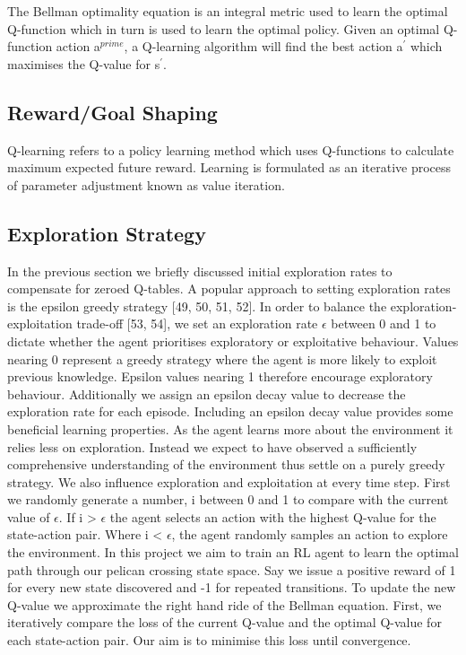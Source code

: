 \documentclass[runningheads]{llncs}
\begin{document}
The Bellman optimality equation is an integral metric used to learn the optimal Q-function
which in turn is used to learn the optimal policy. Given an optimal Q-function action a$^{prime}$, a
Q-learning algorithm will find the best action a$^{\prime}$ which maximises the Q-value for s$^{\prime}$.


\subsection{Reward/Goal Shaping}
Q-learning refers to a policy learning method which uses Q-functions to calculate maximum
expected future reward. Learning is formulated as an iterative process of parameter
adjustment known as value iteration.

\subsection{Exploration Strategy}
In the previous section we briefly discussed initial exploration rates to compensate for
zeroed Q-tables. A popular approach to setting exploration rates is the epsilon greedy
strategy [49, 50, 51, 52]. In order to balance the exploration-exploitation trade-off [53, 54],
we set an exploration rate $\epsilon$ between 0 and 1 to dictate whether the agent prioritises
exploratory or exploitative behaviour. Values nearing 0 represent a greedy strategy where
the agent is more likely to exploit previous knowledge. Epsilon values nearing 1 therefore
encourage exploratory behaviour. Additionally we assign an epsilon decay value to
decrease the exploration rate for each episode. Including an epsilon decay value provides
some beneficial learning properties. As the agent learns more about the environment it
relies less on exploration. Instead we expect to have observed a sufficiently comprehensive
understanding of the environment thus settle on a purely greedy strategy. We also
influence exploration and exploitation at every time step. First we randomly generate
a number, i between 0 and 1 to compare with the current value of $\epsilon$. If i > $\epsilon$ the agent
selects an action with the highest Q-value for the state-action pair. Where i < $\epsilon$, the agent
randomly samples an action to explore the environment.
In this project we aim to train an RL agent to learn the optimal path through our
pelican crossing state space. Say we issue a positive reward of 1 for every new state
discovered and -1 for repeated transitions. To update the new Q-value we approximate
the right hand ride of the Bellman equation. First, we iteratively compare the loss of
the current Q-value and the optimal Q-value for each state-action pair. Our aim is to
minimise this loss until convergence.
\end{document}
